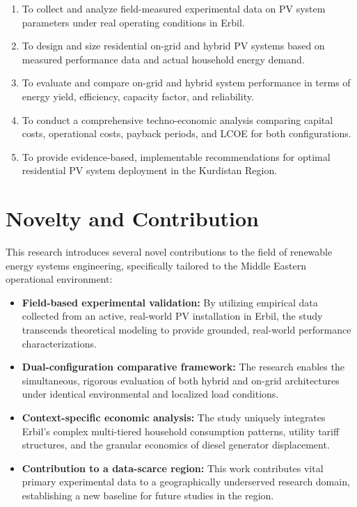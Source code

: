 \begin{enumerate}
    \item To collect and analyze field-measured experimental data on PV system parameters under real operating conditions in Erbil.
    \item To design and size residential on-grid and hybrid PV systems based on measured performance data and actual household energy demand.
    \item To evaluate and compare on-grid and hybrid system performance in terms of energy yield, efficiency, capacity factor, and reliability.
    \item To conduct a comprehensive techno-economic analysis comparing capital costs, operational costs, payback periods, and LCOE for both configurations.
    \item To provide evidence-based, implementable recommendations for optimal residential PV system deployment in the Kurdistan Region.
\end{enumerate}


\section{Novelty and Contribution}

This research introduces several novel contributions to the field of renewable energy systems engineering, specifically tailored to the Middle Eastern operational environment:

\begin{itemize}
    \item \textbf{Field-based experimental validation:} By utilizing empirical data collected from an active, real-world PV installation in Erbil, the study transcends theoretical modeling to provide grounded, real-world performance characterizations.
    \item \textbf{Dual-configuration comparative framework:} The research enables the simultaneous, rigorous evaluation of both hybrid and on-grid architectures under identical environmental and localized load conditions.
    \item \textbf{Context-specific economic analysis:} The study uniquely integrates Erbil's complex multi-tiered household consumption patterns, utility tariff structures, and the granular economics of diesel generator displacement.
    \item \textbf{Contribution to a data-scarce region:} This work contributes vital primary experimental data to a geographically underserved research domain, establishing a new baseline for future studies in the region.
\end{itemize}


